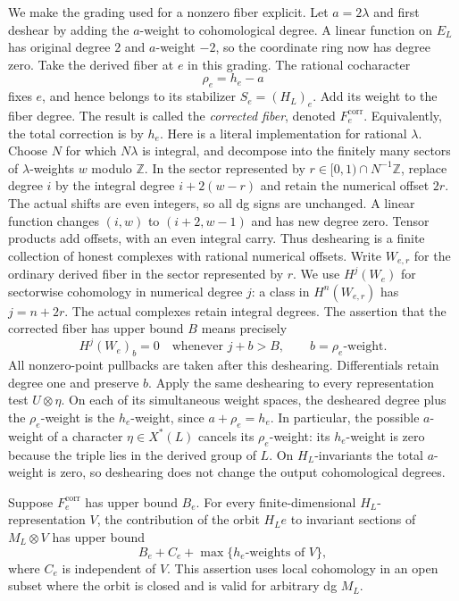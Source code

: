 We make the grading used for a nonzero fiber explicit.
Let $a=2\lambda$ and first deshear by adding the $a$-weight to
cohomological degree.  A linear function on $E_L$ has original
degree $2$ and $a$-weight $-2$, so the coordinate ring now has
degree zero.  Take the derived fiber at $e$ in this grading.
The rational cocharacter
\[
 \rho_e=h_e-a
\]
fixes $e$, and hence belongs to its stabilizer $S_e=(H_L)_e$.
Add its weight to the fiber degree.  The result is called the
\emph{corrected fiber}, denoted $F_e^{\mathrm{corr}}$.
Equivalently, the total correction is by $h_e$.
Here is a literal implementation for rational $\lambda$.
Choose $N$ for which $N\lambda$ is integral, and decompose into the
finitely many sectors of $\lambda$-weights $w$ modulo $\mathbb Z$.
In the sector represented by $r\in[0,1)\cap N^{-1}\mathbb Z$,
replace degree $i$ by the integral degree $i+2(w-r)$ and retain
the numerical offset $2r$.  The actual shifts are even integers,
so all dg signs are unchanged.  A linear function changes
$(i,w)$ to $(i+2,w-1)$ and has new degree zero.
Tensor products add offsets, with an even integral carry.
Thus deshearing is a finite collection of honest complexes with
rational numerical offsets. Write $W_{e,r}$ for the ordinary derived
fiber in the sector represented by $r$. We use $H^j(W_e)$ for
sectorwise cohomology in numerical degree $j$: a class in
$H^n(W_{e,r})$ has $j=n+2r$. The actual complexes retain integral
degrees. The assertion that the corrected fiber has upper bound $B$
means precisely
\begin{equation}
\label{amp:corrected-fiber}
 H^j(W_e)_b=0\quad\text{whenever }j+b>B,
 \qquad b=\text{$\rho_e$-weight}.
\end{equation}
All nonzero-point pullbacks are taken after this deshearing.
Differentials retain degree one and preserve $b$.
Apply the same deshearing to every representation test
$U\otimes\eta$.  On each of its simultaneous weight spaces,
the desheared degree plus the $\rho_e$-weight is the
$h_e$-weight, since $a+\rho_e=h_e$.
In particular, the possible $a$-weight of a character
$\eta\in X^*(L)$ cancels its $\rho_e$-weight: its $h_e$-weight
is zero because the triple lies in the derived group of $L$.
On $H_L$-invariants the total $a$-weight is zero, so deshearing
does not change the output cohomological degrees.

\begin{lemma}
\label{amp:support}
Suppose $F_e^{\mathrm{corr}}$ has upper bound $B_e$.
For every finite-dimensional $H_L$-representation $V$, the
contribution of the orbit $H_Le$ to invariant sections of
$M_L\otimes V$ has upper bound
\begin{equation}
\label{amp:orbit-bound}
 B_e+C_e+\max\{\text{$h_e$-weights of }V\},
\end{equation}
where $C_e$ is independent of $V$.
This assertion uses local cohomology in an open subset where the
orbit is closed and is valid for arbitrary dg $M_L$.
\end{lemma}

